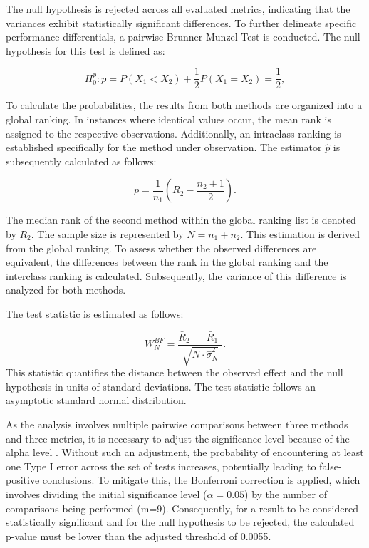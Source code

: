 The null hypothesis is rejected across all evaluated metrics, indicating that the variances exhibit statistically significant differences. 
To further delineate specific performance differentials, a pairwise Brunner-Munzel Test is conducted. 
The null hypothesis for this test is defined as: 

\begin{equation}
    H_0^p: p = P(X_1 < X_2) + \frac{1}{2} P(X_1 = X_2) = \frac{1}{2},
\end{equation}

To calculate the probabilities, the results from both methods are organized into a global ranking. 
In instances where identical values occur, the mean rank is assigned to the respective observations. 
Additionally, an intraclass ranking is established specifically for the method under observation. 
The estimator $\hat{p}$ is subsequently calculated as follows:

\begin{equation}
    p = \frac{1}{n_1}(\overline{R_2}-\frac{n_2+1}{2}).
\end{equation}


The median rank of the second method within the global ranking list is denoted by $\overline{R_2}$. 
The sample size is represented by $N = n_1 + n_2$. 
This estimation is derived from the global ranking. 
To assess whether the observed differences are equivalent, the differences between the rank in the global ranking and the interclass ranking is calculated. 
Subsequently, the variance of this difference is analyzed for both methods.

The test statistic is estimated as follows:

\begin{equation}
    W_N^{BF} = \frac{\bar{R}_{2\cdot} - \bar{R}_{1\cdot}}{\sqrt{N \cdot \hat{\sigma}_N^2}}.
\end{equation}
\newpage
This statistic quantifies the distance between the observed effect and the null hypothesis in units of standard deviations. 
The test statistic follows an asymptotic standard normal distribution.

As the analysis involves multiple pairwise comparisons between three methods and three metrics, it is necessary to adjust the significance level because of the alpha level \citep[p. 1]{abdi2007bonferroni}. 
Without such an adjustment, the probability of encountering at least one Type I error across the set of tests increases, potentially leading to false-positive conclusions. 
To mitigate this, the Bonferroni correction is applied, which involves dividing the initial significance level ($\alpha=0.05$) by the number of comparisons being performed (m=9). 
Consequently, for a result to be considered statistically significant and for the null hypothesis to be rejected, the calculated p-value must be lower than the adjusted threshold of 0.0055.

